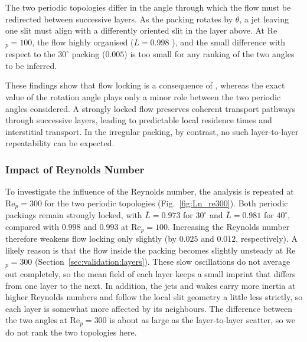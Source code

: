 The two periodic topologies differ in the angle through which the flow must be redirected between successive layers. As the packing rotates by $\theta$, a jet leaving one slit must align with a differently oriented slit in the layer above.  At Re$_p=100$, the flow  highly organised  ($\overline{L}=0.998$ ), and the small difference with respect to the $30^\circ$ packing ($0.005$) is too small for any ranking of the two angles to be inferred.

These findings show that flow locking is a consequence of , whereas the exact value of the rotation angle plays only a minor role between the two periodic angles considered. A strongly locked flow preserves coherent transport pathways through successive layers, leading to predictable local residence times and interstitial transport. In the irregular packing, by contrast, no such layer-to-layer repeatability can be expected.

\subsubsection{Impact of Reynolds Number}
\label{sec:locking:reynolds}

To investigate the influence of the Reynolds number, the analysis is repeated at Re$_p=300$ for the two periodic topologies (Fig.~\ref{fig:Ln_re300}). Both periodic packings remain strongly locked, with $\overline{L}=0.973$ for $30^\circ$ and $\overline{L}=0.981$ for $40^\circ$, compared with $0.998$ and $0.993$ at Re$_p=100$. Increasing the Reynolds number therefore weakens flow locking only slightly (by $0.025$ and $0.012$, respectively). A likely reason is that the flow inside the packing becomes slightly unsteady at Re$_p=300$ (Section~\ref{sec:validation:layers}). These slow oscillations do not average out completely, so the mean field of each layer keeps a small imprint that differs from one layer to the next. In addition, the jets and wakes carry more inertia at higher Reynolds numbers and follow the local slit geometry a little less strictly, so each layer is somewhat more affected by its neighbours. The difference between the two angles at Re$_p=300$ is about as large as the layer-to-layer scatter, so we do not rank the two topologies here.

